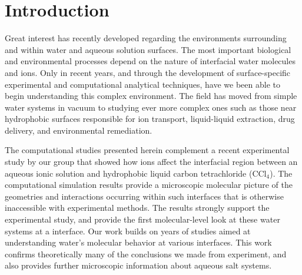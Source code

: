 \section{Introduction}

Great interest has recently developed regarding the environments surrounding and within water and aqueous solution surfaces. The most important biological and environmental processes depend on the nature of interfacial water molecules and ions. Only in recent years, and through the development of surface-specific experimental\cite{Charreteur2008,Chen2007,Luo2006,McArthur2006} and computational\cite{Schnell2004,Su2005,Wardle2005,Wick2008a} analytical techniques, have we been able to begin understanding this complex environment. The field has moved from simple water systems in vacuum to studying ever more complex ones such as those near hydrophobic surfaces responsible for ion transport, liquid-liquid extraction, drug delivery, and environmental remediation.

The computational studies presented herein complement a recent experimental study by our group that showed how ions affect the interfacial region between an aqueous ionic solution and hydrophobic liquid carbon tetrachloride (CCl$_4$).\cite{McFearin2009} The computational simulation results provide a microscopic molecular picture of the geometries and interactions occurring within such interfaces that is otherwise inaccessible with experimental methods. The results strongly support the experimental study, and provide the first molecular-level look at these water systems at a \ctc interface. Our work builds on years of studies aimed at understanding water's molecular behavior at various interfaces. This work confirms theoretically many of the conclusions we made from experiment, and also provides further microscopic information about aqueous salt systems.

